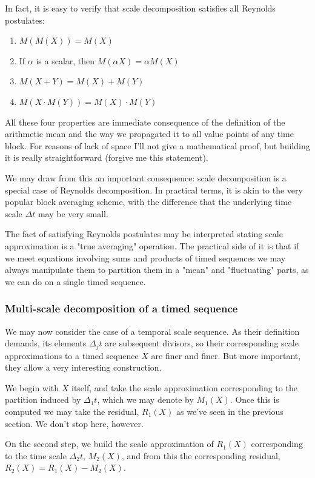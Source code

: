 \documentclass[a4paper,10pt]{book}
\begin{document}
In fact, it is easy to verify that scale decomposition satisfies all Reynolds postulates:

\begin{enumerate}
\item $M(M(X)) = M(X)$
\item If $\alpha$ is a scalar, then $M(\alpha X) = \alpha M(X)$
\item $M(X+Y) = M(X) + M(Y)$
\item $M(X\cdot M(Y)) = M(X) \cdot M(Y)$
\end{enumerate}

All these four properties are immediate consequence of the definition of the arithmetic mean and the way we propagated it to all value points of any time block. For reasons of lack of space I'll not give a mathematical proof, but building it is really straightforward (forgive me this statement).

We may draw from this an important consequence: scale decomposition is a special case of Reynolds decomposition. In practical terms, it is akin to the very popular block averaging scheme, with the difference that the underlying time scale $\Delta t$ may be very small.

The fact of satisfying Reynolds postulates may be interpreted stating scale approximation is a "true averaging" operation. The practical side of it is that if we meet equations involving sums and products of timed sequences we may always manipulate them to partition them in a "mean" and "fluctuating" parts, as we can do on a single timed sequence.


\subsubsection{Multi-scale decomposition of a timed sequence}

We may now consider the case of a temporal scale sequence. As their definition demands, its elements $\Delta_{j} t$ are subsequent divisors, so their corresponding scale approximations to a timed sequence $X$ are finer and finer. But more important, they allow a very interesting construction.

We begin with $X$ itself, and take the scale approximation corresponding to the partition induced by $\Delta_{1} t$, which we may denote by $M_{1}(X)$. Once this is computed we may take the residual, $R_{1}(X)$ as we've seen in the previous section. We don't stop here, however.

On the second step, we build the scale approximation of $R_{1}(X)$ corresponding to the time scale $\Delta_{2} t$, $M_{2}(X)$, and from this the corresponding residual, $R_{2}(X) = R_{1}(X) - M_{2}(X)$.
\end{document}
